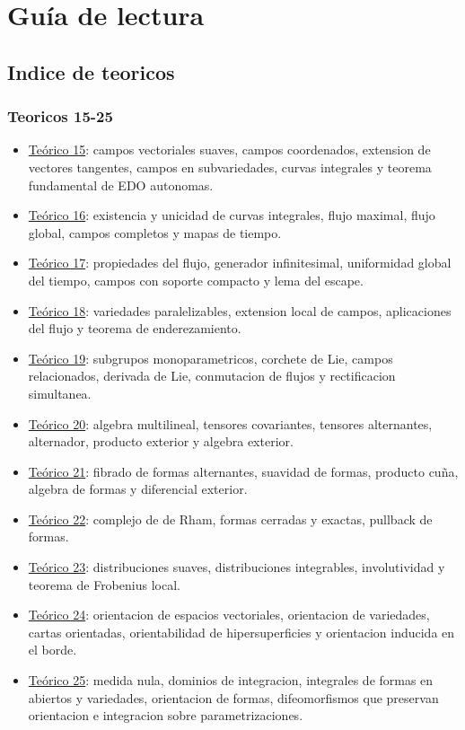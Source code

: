 \chapter{Guía de lectura}
\label{ch:glosario-teorico}
\section{Indice de teoricos}
\subsection{Teoricos 15-25}
\begin{itemize}
\item \hyperref[ch:teo-15]{Teórico 15}: campos vectoriales suaves, campos coordenados, extension de vectores tangentes, campos en subvariedades, curvas integrales y teorema fundamental de EDO autonomas.
\item \hyperref[ch:teo-16]{Teórico 16}: existencia y unicidad de curvas integrales, flujo maximal, flujo global, campos completos y mapas de tiempo.
\item \hyperref[ch:teo-17]{Teórico 17}: propiedades del flujo, generador infinitesimal, uniformidad global del tiempo, campos con soporte compacto y lema del escape.
\item \hyperref[ch:teo-18]{Teórico 18}: variedades paralelizables, extension local de campos, aplicaciones del flujo y teorema de enderezamiento.
\item \hyperref[ch:teo-19]{Teórico 19}: subgrupos monoparametricos, corchete de Lie, campos relacionados, derivada de Lie, conmutacion de flujos y rectificacion simultanea.
\item \hyperref[ch:teo-20]{Teórico 20}: algebra multilineal, tensores covariantes, tensores alternantes, alternador, producto exterior y algebra exterior.
\item \hyperref[ch:teo-21]{Teórico 21}: fibrado de formas alternantes, suavidad de formas, producto cuña, algebra de formas y diferencial exterior.
\item \hyperref[ch:teo-22]{Teórico 22}: complejo de de Rham, formas cerradas y exactas, pullback de formas.
\item \hyperref[ch:teo-23]{Teórico 23}: distribuciones suaves, distribuciones integrables, involutividad y teorema de Frobenius local.
\item \hyperref[ch:teo-24]{Teórico 24}: orientacion de espacios vectoriales, orientacion de variedades, cartas orientadas, orientabilidad de hipersuperficies y orientacion inducida en el borde.
\item \hyperref[ch:teo-25]{Teórico 25}: medida nula, dominios de integracion, integrales de formas en abiertos y variedades, orientacion de formas, difeomorfismos que preservan orientacion e integracion sobre parametrizaciones.
\end{itemize}
